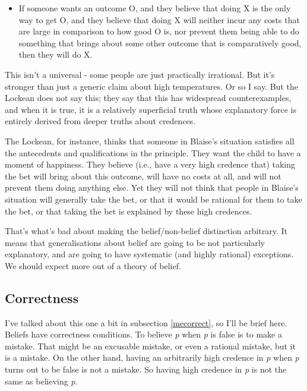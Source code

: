 \documentclass[
  11pt,
]{book}
\providecommand{\tightlist}{%
  \setlength{\itemsep}{0pt}\setlength{\parskip}{0pt}}
\begin{document}
\begin{itemize}
\tightlist
\item
  If someone wants an outcome O, and they believe that doing X is the only way to get O, and they believe that doing X will neither incur any costs that are large in comparison to how good O is, nor prevent them being able to do something that brings about some other outcome that is comparatively good, then they will do X.
\end{itemize}

This isn't a universal - some people are just practically irrational. But it's stronger than just a generic claim about high temperatures. Or so I say. But the Lockean does not say this; they say that this has widespread counterexamples, and when it is true, it is a relatively superficial truth whose explanatory force is entirely derived from deeper truths about credences.

The Lockean, for instance, thinks that someone in Blaise's situation satisfies all the antecedents and qualifications in the principle. They want the child to have a moment of happiness. They believe (i.e., have a very high credence that) taking the bet will bring about this outcome, will have no costs at all, and will not prevent them doing anything else. Yet they will not think that people in Blaise's situation will generally take the bet, or that it would be rational for them to take the bet, or that taking the bet is explained by these high credences.

That's what's bad about making the belief/non-belief distinction arbitrary. It means that generalisations about belief are going to be not particularly explanatory, and are going to have systematic (and highly rational) exceptions. We should expect more out of a theory of belief.

\hypertarget{lockecorrect}{%
\subsection{Correctness}\label{lockecorrect}}

I've talked about this one a bit in subsection \ref{mecorrect}, so I'll be brief here. Beliefs have correctness conditions. To believe \emph{p} when \emph{p} is false is to make a mistake. That might be an excusable mistake, or even a rational mistake, but it is a mistake. On the other hand, having an arbitrarily high credence in \emph{p} when \emph{p} turns out to be false is not a mistake. So having high credence in \emph{p} is not the same as believing \emph{p}.
\end{document}
